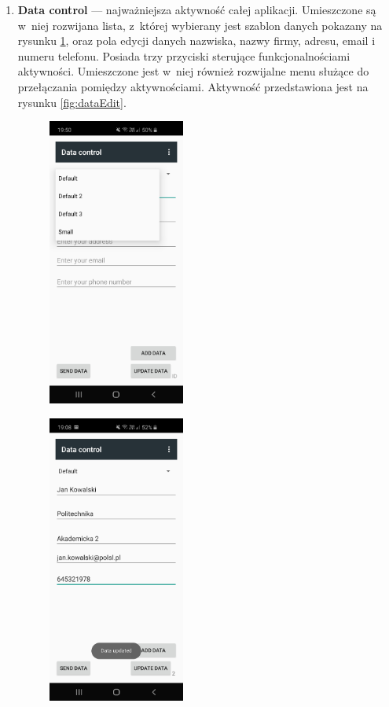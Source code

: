 \documentclass[a4paper,12pt, twoside]{article}
\begin{document}
\begin{enumerate}
    	   \item \textbf{Data control} — najważniejsza aktywność całej aplikacji. Umieszczone są w~niej rozwijana lista, z~której wybierany jest szablon danych pokazany na rysunku \ref{fig:dataControl}, oraz pola edycji danych nazwiska, nazwy firmy, adresu, email i numeru telefonu. Posiada trzy przyciski sterujące funkcjonalnościami aktywności. Umieszczone jest w~niej również rozwijalne menu służące do przełączania pomiędzy aktywnościami. Aktywność przedstawiona jest na rysunku \ref{fig:dataEdit}.
    	   \begin{figure}[H]
    	        \centering
    	        \begin{minipage}{.5\textwidth}
    	            \centering
    	            \includegraphics[width=4.5cm]{images/view_dataControl.jpg}
                    \label{fig:dataControl}
                \end{minipage}%
                \begin{minipage}{.5\textwidth}
                    \centering
    	            \includegraphics[width=4.5cm]{images/view_dataEdit.jpg}

\end{minipage}
\end{figure}
\end{enumerate}
\end{document}
